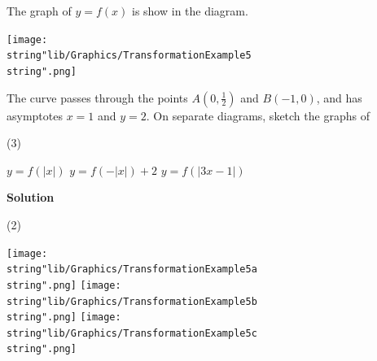 \documentclass[11pt,a4paper]{book}
\begin{document}
\begin{example}{}

The graph of $y=f\left(x\right)$ is show in the diagram.
\begin{center}
\texttt{[image: \\string"lib/Graphics/TransformationExample5\\string".png]}
\par\end{center}

The curve passes through the points ${\displaystyle A\left(0,\frac{1}{2}\right)}$
and $B\left(-1,0\right)$, and has asymptotes $x=1$ and $y=2$. On
separate diagrams, sketch the graphs of

\begin{tasks}[label=(\alph*),label-width=3.5ex] (3)

\task $y=f\left(\left|x\right|\right)$
\task $y=f\left(-\left|x\right|\right)+2$
\task $y=f\left(\left|3x-1\right|\right)$

\end{tasks}


\textbf{Solution}
\begin{tasks}[label=(\alph*),label-width=3.5ex] (2)

\task \texttt{[image: \\string"lib/Graphics/TransformationExample5a\\string".png]}
\task \texttt{[image: \\string"lib/Graphics/TransformationExample5b\\string".png]}
\task \texttt{[image: \\string"lib/Graphics/TransformationExample5c\\string".png]}

\end{tasks}

\end{example}

\newpage
\end{document}
